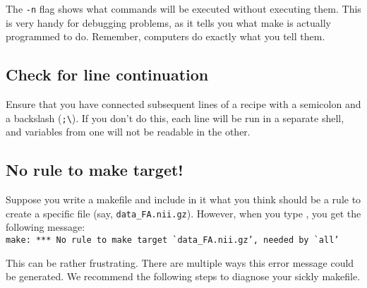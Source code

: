 The \texttt{-n} flag shows what commands will be executed without executing them. This is very handy for debugging problems, as it tells you what make is actually programmed to do. Remember, computers do exactly what you tell them.

\subsection{Check for line continuation}

Ensure that you have connected subsequent lines of a recipe with a semicolon and a backslash (\texttt{;\textbackslash}). If you don't do this, each line will be run in a separate shell, and variables from one will not be readable in the other.

\subsection{No rule to make target!}

Suppose you write a makefile and include in it what you think should be a rule to create a specific file (say, \texttt{data_FA.nii.gz}). However, when you type \maken, you get the following message: \\
\texttt{make: *** No rule to make target \`{}data_FA.nii.gz', needed by \`{}all'}

This can be rather frustrating. There are multiple ways this error message could be generated. We recommend the following steps to diagnose your sickly makefile.

